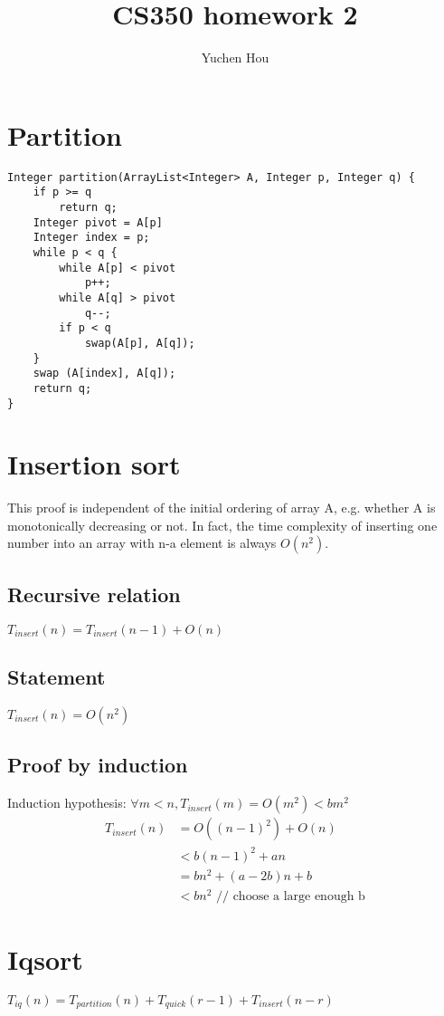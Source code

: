 \documentclass{article}
\begin{document}
\lstset{language=Java}
\title{CS350 homework 2}
\author{Yuchen Hou}
\maketitle

\section{Partition}
\begin{lstlisting}
Integer partition(ArrayList<Integer> A, Integer p, Integer q) {
	if p >= q
		return q;
	Integer pivot = A[p]
	Integer index = p;
	while p < q {
		while A[p] < pivot
			p++;
		while A[q] > pivot
			q--;
		if p < q
			swap(A[p], A[q]);
	}
	swap (A[index], A[q]);
	return q;
}
\end{lstlisting}

\section{Insertion sort}
This proof is independent of the initial ordering of array A, e.g. whether A is
monotonically decreasing or not. In fact, the time complexity of inserting one
number into an array with n-a element is always $O(n^2)$.

\subsection{Recursive relation}
$T_{insert}(n) = T_{insert}(n - 1) + O(n)$

\subsection{Statement}
$T_{insert}(n) = O(n^2)$

\subsection{Proof by induction}
Induction hypothesis: $\forall m < n, T_{insert}(m) = O(m^2) < b m^2$
\begin{align*}
T_{insert}(n)
&= O((n-1)^2) + O(n)\\
&< b(n-1)^2 + an\\
&= b n^2 + (a - 2b)n + b\\
&< b n^2 \text{ // choose a large enough b}
\end{align*}

\section{Iqsort}
$T_{iq}(n) = T_{partition}(n) + T_{quick}(r-1) + T_{insert}(n-r)$
\end{document}
